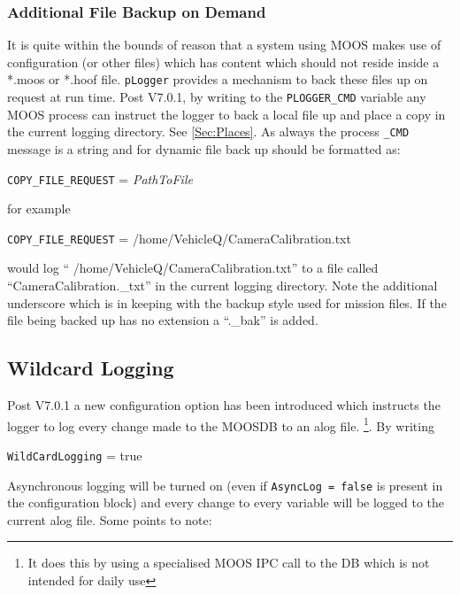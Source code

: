 \documentclass[a4paper,10pt]{article}
\newcommand{\Code}[1]{\texttt{#1} }
\newcommand{\code}[1]{\Code{#1} }
\begin{document}
\subsubsection{Additional File Backup on Demand}
It is quite within the bounds of reason that a system using MOOS makes use of
configuration (or other files) which has content which should not reside inside a *.moos or *.hoof file.
\code{pLogger} provides a mechanism to back these files up on request at run time. Post V7.0.1, by writing to the \code{PLOGGER\_CMD}
variable any MOOS process can instruct the logger to back a local file up and place a copy in the current logging directory. See \ref{Sec:Places}. As always the process \code{\_CMD} message is a string and for dynamic file back up should be formatted as:

\begin{center}
\code{COPY\_FILE\_REQUEST} =  \textit{PathToFile}
\end{center}

for example

\begin{center}
\code{COPY\_FILE\_REQUEST} =  /home/VehicleQ/CameraCalibration.txt
\end{center}

would log `` /home/VehicleQ/CameraCalibration.txt'' to a file called ``CameraCalibration.\_txt'' in the current logging directory. Note the additional underscore which is in keeping with the backup style used for mission files. If the file being backed up has no extension a ``.\_bak'' is added.

\subsection{Wildcard Logging}

Post V7.0.1 a new configuration option has been introduced which instructs the logger to log every change made to the MOOSDB to an alog file. \footnote{It does this by using a specialised MOOS IPC call to the DB which is not intended for daily use }. By writing

\begin{center}
\code{WildCardLogging} =  true
\end{center}

Asynchronous logging will be turned on (even if \code{AsyncLog = false} is present in the configuration block) and every change to every variable will be logged to the current alog file. Some points to note:
\end{document}
